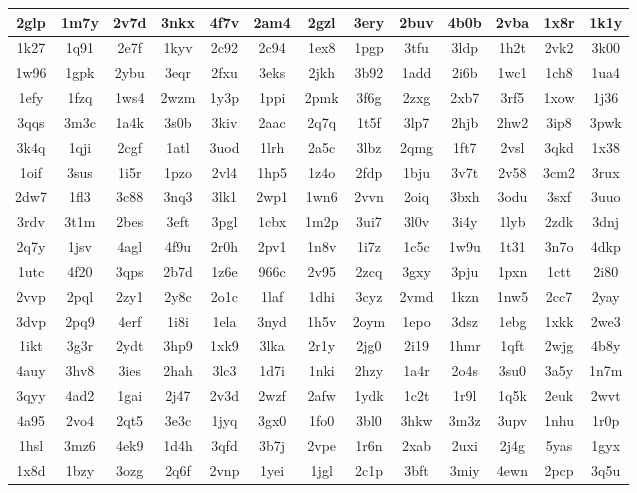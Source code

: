 \begin{tabular}{|c|c|c|c|c|c|c|c|c|c|c|c|c|}
\hline
2glp & 1m7y & 2v7d & 3nkx & 4f7v & 2am4 & 2gzl & 3ery & 2buv & 4b0b & 2vba & 1x8r & 1k1y \\
\hline
1k27 & 1q91 & 2e7f & 1kyv & 2c92 & 2c94 & 1ex8 & 1pgp & 3tfu & 3ldp & 1h2t & 2vk2 & 3k00 \\
\hline
1w96 & 1gpk & 2ybu & 3eqr & 2fxu & 3eks & 2jkh & 3b92 & 1add & 2i6b & 1wc1 & 1ch8 & 1ua4 \\
\hline
1efy & 1fzq & 1ws4 & 2wzm & 1y3p & 1ppi & 2pmk & 3f6g & 2zxg & 2xb7 & 3rf5 & 1xow & 1j36 \\
\hline
3qqs & 3m3c & 1a4k & 3s0b & 3kiv & 2aac & 2q7q & 1t5f & 3lp7 & 2hjb & 2hw2 & 3ip8 & 3pwk \\
\hline
3k4q & 1qji & 2cgf & 1atl & 3uod & 1lrh & 2a5c & 3lbz & 2qmg & 1ft7 & 2vsl & 3qkd & 1x38 \\
\hline
1oif & 3sus & 1i5r & 1pzo & 2vl4 & 1hp5 & 1z4o & 2fdp & 1bju & 3v7t & 2v58 & 3cm2 & 3rux \\
\hline
2dw7 & 1fl3 & 3c88 & 3nq3 & 3lk1 & 2wp1 & 1wn6 & 2vvn & 2oiq & 3bxh & 3odu & 3sxf & 3uuo \\
\hline
3rdv & 3t1m & 2bes & 3eft & 3pgl & 1cbx & 1m2p & 3ui7 & 3l0v & 3i4y & 1lyb & 2zdk & 3dnj \\
\hline
2q7y & 1jsv & 4agl & 4f9u & 2r0h & 2pv1 & 1n8v & 1i7z & 1c5c & 1w9u & 1t31 & 3n7o & 4dkp \\
\hline
1utc & 4f20 & 3qps & 2b7d & 1z6e & 966c & 2v95 & 2zcq & 3gxy & 3pju & 1pxn & 1ctt & 2i80 \\
\hline
2vvp & 2pql & 2zy1 & 2y8c & 2o1c & 1laf & 1dhi & 3cyz & 2vmd & 1kzn & 1nw5 & 2cc7 & 2yay \\
\hline
3dvp & 2pq9 & 4erf & 1i8i & 1ela & 3nyd & 1h5v & 2oym & 1epo & 3dsz & 1ebg & 1xkk & 2we3 \\
\hline
1ikt & 3g3r & 2ydt & 3hp9 & 1xk9 & 3lka & 2r1y & 2jg0 & 2i19 & 1hmr & 1qft & 2wjg & 4b8y \\
\hline
4auy & 3hv8 & 3ies & 2hah & 3lc3 & 1d7i & 1nki & 2hzy & 1a4r & 2o4s & 3su0 & 3a5y & 1n7m \\
\hline
3qyy & 4ad2 & 1gai & 2j47 & 2v3d & 2wzf & 2afw & 1ydk & 1c2t & 1r9l & 1q5k & 2euk & 2wvt \\
\hline
4a95 & 2vo4 & 2qt5 & 3e3c & 1jyq & 3gx0 & 1fo0 & 3bl0 & 3hkw & 3m3z & 3upv & 1nhu & 1r0p \\
\hline
1hsl & 3mz6 & 4ek9 & 1d4h & 3qfd & 3b7j & 2vpe & 1r6n & 2xab & 2uxi & 2j4g & 5yas & 1gyx \\
\hline
1x8d & 1bzy & 3ozg & 2q6f & 2vnp & 1yei & 1jgl & 2c1p & 3bft & 3miy & 4ewn & 2pcp & 3q5u \\

\end{tabular}
